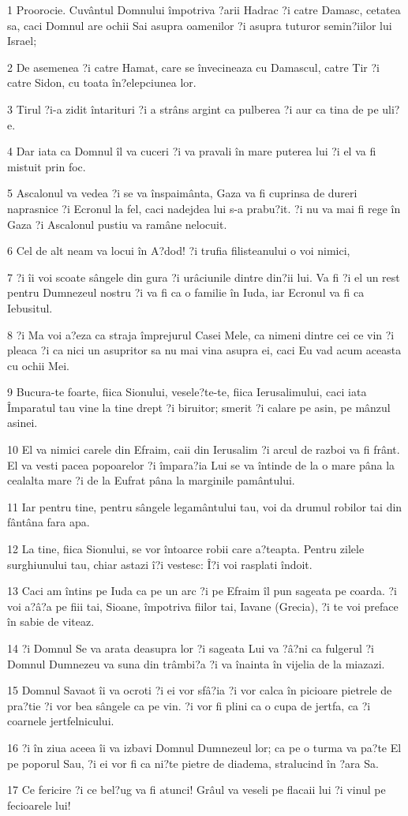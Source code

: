 \par 1 Proorocie. Cuvântul Domnului împotriva ?arii Hadrac ?i catre Damasc, cetatea sa, caci Domnul are ochii Sai asupra oamenilor ?i asupra tuturor semin?iilor lui Israel;
\par 2 De asemenea ?i catre Hamat, care se învecineaza cu Damascul, catre Tir ?i catre Sidon, cu toata în?elepciunea lor.
\par 3 Tirul ?i-a zidit întarituri ?i a strâns argint ca pulberea ?i aur ca tina de pe uli?e.
\par 4 Dar iata ca Domnul îl va cuceri ?i va pravali în mare puterea lui ?i el va fi mistuit prin foc.
\par 5 Ascalonul va vedea ?i se va înspaimânta, Gaza va fi cuprinsa de dureri naprasnice ?i Ecronul la fel, caci nadejdea lui s-a prabu?it. ?i nu va mai fi rege în Gaza ?i Ascalonul pustiu va ramâne nelocuit.
\par 6 Cel de alt neam va locui în A?dod! ?i trufia filisteanului o voi nimici,
\par 7 ?i îi voi scoate sângele din gura ?i urâciunile dintre din?ii lui. Va fi ?i el un rest pentru Dumnezeul nostru ?i va fi ca o familie în Iuda, iar Ecronul va fi ca Iebusitul.
\par 8 ?i Ma voi a?eza ca straja împrejurul Casei Mele, ca nimeni dintre cei ce vin ?i pleaca ?i ca nici un asupritor sa nu mai vina asupra ei, caci Eu vad acum aceasta cu ochii Mei.
\par 9 Bucura-te foarte, fiica Sionului, vesele?te-te, fiica Ierusalimului, caci iata Împaratul tau vine la tine drept ?i biruitor; smerit ?i calare pe asin, pe mânzul asinei.
\par 10 El va nimici carele din Efraim, caii din Ierusalim ?i arcul de razboi va fi frânt. El va vesti pacea popoarelor ?i împara?ia Lui se va întinde de la o mare pâna la cealalta mare ?i de la Eufrat pâna la marginile pamântului.
\par 11 Iar pentru tine, pentru sângele legamântului tau, voi da drumul robilor tai din fântâna fara apa.
\par 12 La tine, fiica Sionului, se vor întoarce robii care a?teapta. Pentru zilele surghiunului tau, chiar astazi î?i vestesc: Î?i voi rasplati îndoit.
\par 13 Caci am întins pe Iuda ca pe un arc ?i pe Efraim îl pun sageata pe coarda. ?i voi a?â?a pe fiii tai, Sioane, împotriva fiilor tai, Iavane (Grecia), ?i te voi preface în sabie de viteaz.
\par 14 ?i Domnul Se va arata deasupra lor ?i sageata Lui va ?â?ni ca fulgerul ?i Domnul Dumnezeu va suna din trâmbi?a ?i va înainta în vijelia de la miazazi.
\par 15 Domnul Savaot îi va ocroti ?i ei vor sfâ?ia ?i vor calca în picioare pietrele de pra?tie ?i vor bea sângele ca pe vin. ?i vor fi plini ca o cupa de jertfa, ca ?i coarnele jertfelnicului.
\par 16 ?i în ziua aceea îi va izbavi Domnul Dumnezeul lor; ca pe o turma va pa?te El pe poporul Sau, ?i ei vor fi ca ni?te pietre de diadema, stralucind în ?ara Sa.
\par 17 Ce fericire ?i ce bel?ug va fi atunci! Grâul va veseli pe flacaii lui ?i vinul pe fecioarele lui!

